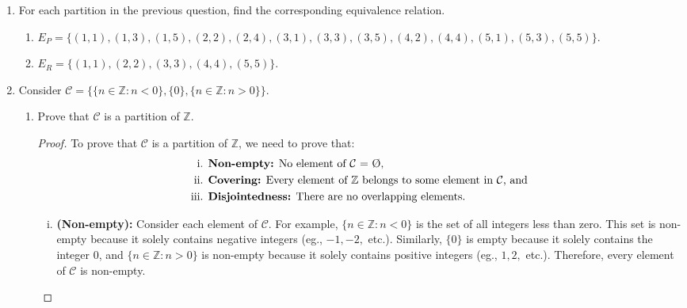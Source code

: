 \documentclass{article}
\begin{document}
\begin{enumerate}
    	\item For each partition in the previous question, find the corresponding equivalence relation.
                \begin{enumerate}
                    \item $E_P = \bigl\{ (1, 1), (1, 3), (1, 5), (2, 2), (2, 4), (3, 1), (3, 3), (3, 5), (4, 2), (4, 4), (5, 1), (5, 3), (5, 5) \bigr\}$.
                    \item $E_R = \bigl\{ (1, 1), (2, 2), (3, 3), (4, 4), (5, 5) \bigr\}$.
                \end{enumerate}

    	\item Consider $\mathcal{C} = \{ \{ n \in \mathbb{Z} : n < 0 \}, \{ 0 \}, \{ n \in \mathbb{Z} : n > 0 \} \}$.
    		\begin{enumerate}

    			\item Prove that $\mathcal{C}$ is a partition of $\mathbb{Z}$.
                        \begin{proof}
                            To prove that $\mathcal{C}$ is a partition of $\mathbb{Z}$, we need to prove that:\
                                \begin{align*}
                                    \text{i. }   & \text{\textbf{Non-empty:} No element of $\mathcal{C}$ = \O,}  \\
                                    \text{ii. }  & \text{\textbf{Covering:} Every element of $\mathbb{Z}$ belongs to some element in $\mathcal{C}$, and} \\
                                    \text {iii. }& \text{\textbf{Disjointedness:} There are no overlapping elements.}
                                \end{align*}
                                
                            \begin{enumerate}[i.]
                                \item\textbf{(Non-empty):} 
                                    Consider each element of $\mathcal{C}$. For example, $\{ n\in\mathbb{Z} : n < 0\}$ is the set of all integers less than zero. This set is non-empty because it solely contains negative integers (eg., $\minus 1, \minus 2,$ etc.). Similarly, $\{ 0 \}$ is empty because it solely contains the integer $0$, and $\{ n\in\mathbb{Z} : n > 0\}$ is non-empty because it solely contains positive integers (eg., $1, 2,$ etc.). Therefore, every element of $\mathcal{C}$ is non-empty. \\ 


\end{enumerate}
\end{proof}
\end{enumerate}
\end{enumerate}
\end{document}
